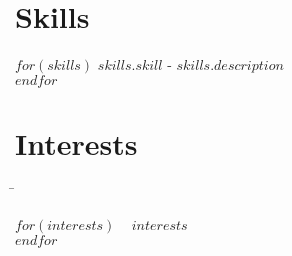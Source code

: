 \documentclass[10pt]{article} %
\newcommand{\sqbullet}{~\vrule height 1ex width .8ex depth -.2ex} %
\newcommand{\interestsgroup}[1]{
\begin{tabbing}
\hspace{3mm} \= \kill
#1
\end{tabbing}
\vspace{-10mm}
}
\newcommand{\interest}[1]{\sqbullet \> \textbf{#1}\\[3pt]} %
\begin{document}
\section{Skills}
$for(skills)$
\textit{$skills.skill$} - $skills.description$\\
$endfor$


\section{Interests}

\interestsgroup{
$for(interests)$
\interest{$interests$}
$endfor$
}
\end{document}
